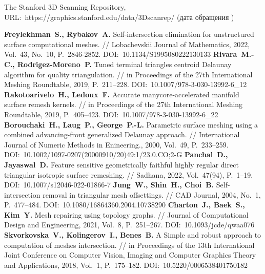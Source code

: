 \begin{thebibliography}{99}
 The Stanford 3D Scanning Repository, \\ URL:~https://graphics.stanford.edu/data/3Dscanrep/ (дата обращения \StrDate)


\textbf{Freylekhman~S., Rybakov~A.} Self-intersection elimination for unstructured surface computational meshes. // Lobachevskii Journal of Mathematics, 2022, Vol.~43, No.~10, P.~2846-2852. DOI:~10.1134/S1995080222130133
\textbf{Rivara~M.-C., Rodrigez-Moreno~P.} Tuned terminal triangles centroid Delaunay algorithm for quality triangulation. // in Proceedings of the 27th International Meshing Roundtable, 2019, P.~211–228. DOI:~10.1007/978-3-030-13992-6\_12
\textbf{Rakotoarivelo~H., Ledoux~F.} Accurate manycore-accelerated manifold surface remesh kernels. // in Proceedings of the 27th International Meshing Roundtable, 2019, P.~405–423. DOI:~10.1007/978-3-030-13992-6\_22
\textbf{Borouchaki~H., Laug~P., George~P.-L.} Parametric surface meshing using a combined advancing-front generalized Delaunay approach. // International Journal of Numeric Methods in Enineering., 2000, Vol.~49, P.~233–259. DOI:~10.1002/1097-0207(20000910/20)49:1/23.0.CO;2-G
\textbf{Panchal~D., Jayaswal~D.} Feature sensitive geometrically faithful highly regular direct triangular isotropic surface remeshing. // Sadhana, 2022, Vol.~47(94), P.~1–19. DOI:~10.1007/s12046-022-01866-7
\textbf{Jung~W., Shin~H., Choi~B.} Self-intersection removal in triangular mesh offsettings. // CAD Journal, 2004, No.~1, P.~477–484. DOI:~10.1080/16864360.2004.10738290
\textbf{Charton~J., Baek~S., Kim~Y.} Mesh repairing using topology graphs. // Journal of Computational Design and Engineering, 2021, Vol.~8, P.~251–267. DOI:~10.1093/jcde/qwaa076
\textbf{Skvorkovska~V., Kolingerov~I., Benes~B.} A Simple and robust approach to computation of meshes intersection. // in Proceedings of the 13th International Joint Conference on Computer Vision, Imaging and Computer Graphics Theory and Applications, 2018, Vol.~1, P.~175–182. DOI:~10.5220/0006538401750182


\end{thebibliography}
